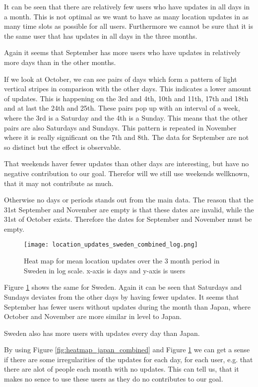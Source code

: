 It can be seen that there are relatively few users who have updates in all days in a month. This is not optimal as we want to have as many location updates in as many time slots as possible for all users. Furthermore we cannot be sure that it is the same user that has updates in all days in the three months.

Again it seems that September has more users who have updates in relatively more days than in the other months.

If we look at October, we can see pairs of days which form a pattern of light vertical stripes in comparison with the other days. This indicates a lower amount of updates. This is happening on the 3rd and 4th, 10th and 11th, 17th and 18th and at last the 24th and 25th. These pairs pop up with an interval of a week, where the 3rd is a Saturday and the 4th is a Sunday. This means that the other pairs are also Saturdays and Sundays. This pattern is repeated in November where it is really significant on the 7th and 8th. The data for September are not so distinct but the effect is observable.

That weekends haver fewer updates than other days are interesting, but have no negative contribution to our goal. Therefor will we still use weekends wellknown, that it may not contribute as much. 

Otherwise no days or periods stands out from the main data. The reason that the 31st September and November are empty is that these dates are invalid, while the 31st of October exists. Therefore the dates for September and November must be empty.  

\begin{figure}[H]
    \hspace*{-1.5cm}
    \centering
    \texttt{[image: location\_updates\_sweden\_combined\_log.png]}
    \caption{Heat map for mean location updates over the 3 month period in Sweden in log scale. x-axis is days and y-axis is users}
    \label{fig:heatmap_sweden_combined}
\end{figure}
Figure \ref{fig:heatmap_sweden_combined} shows the same for Sweden. Again it can be seen that Saturdays and Sundays deviates from the other days by having fewer updates. It seems that September has fewer users without updates during the month than Japan, where October and November are more similar in level to Japan. 

Sweden also has more users with updates every day than Japan. 

By using Figure \ref{fig:heatmap_japan_combined} and Figure \ref{fig:heatmap_sweden_combined} we can get a sense if there are some irregularities of the updates for each day, for each user, e.g. that there are alot of people each month with no updates. This can tell us, that it makes no sence to use these users as they do no contributes to our goal. 

